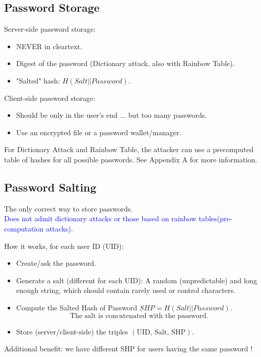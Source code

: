 \subsection*{Password Storage}
\begin{multicols}{2}
    Server-side password storage:
    \begin{itemize}
        \item NEVER in cleartext.
        \item Digest of the password (Dictionary attack, also with Rainbow Table).
        \item "Salted" hash: $H(Salt || Password)$.
    \end{itemize}
    
    \columnbreak

    Client-side password storage:
    \begin{itemize}
        \item Should be only in the user's end ... but too many passwords.
        \item Use an encrypted file or a password wallet/manager.
    \end{itemize}
\end{multicols}

\begin{tcolorbox}[colback=blue!10!white, colframe=blue!50!white]
For Dictionary Attack and Rainbow Table, the attacker can use a precomputed table of hashes for all possible passwords. See Appendix A for more information.
\end{tcolorbox}

\subsection{Password Salting}
\begin{center}
    The only correct way to store passwords.\\ \textcolor{Blue}{Does not admit dictionary attacks or those based on rainbow tables(pre-computation attacks).}
\end{center}
How it works, for each user ID (UID):
\begin{itemize}
    \item Create/ask the password.
    \item Generate a salt (different for each UID): A random (unpredictable) and long enough string, which should contain rarely used or control characters.
    \item Compute the Salted Hash of Password \(SHP = H(Salt || Password)\).
    \[\text{The salt is concatenated with the password.} \]
    \item Store (server/client-side) the triples \((\text{UID, Salt, SHP})\).
\end{itemize}
Additional benefit: we have different SHP for users having the same password !

